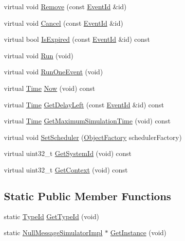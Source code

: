 \begin{DoxyCompactItemize}
\item 
virtual void \hyperlink{classns3_1_1NullMessageSimulatorImpl_a1b051000ba1d74a9cd78a609822465b0}{Remove} (const \hyperlink{classns3_1_1EventId}{Event\+Id} \&id)
\item 
virtual void \hyperlink{classns3_1_1NullMessageSimulatorImpl_acfa9062b608a3b3ddcf03cec0d63897a}{Cancel} (const \hyperlink{classns3_1_1EventId}{Event\+Id} \&id)
\item 
virtual bool \hyperlink{classns3_1_1NullMessageSimulatorImpl_ae7d4cb0311ded5e063a9cdc06b6449d6}{Is\+Expired} (const \hyperlink{classns3_1_1EventId}{Event\+Id} \&id) const 
\item 
virtual void \hyperlink{classns3_1_1NullMessageSimulatorImpl_ab6919d906d7706a688b4452127860b77}{Run} (void)
\item 
virtual void \hyperlink{classns3_1_1NullMessageSimulatorImpl_a58772e74e6e1b546a843d7a62b708069}{Run\+One\+Event} (void)
\item 
virtual \hyperlink{classns3_1_1Time}{Time} \hyperlink{classns3_1_1NullMessageSimulatorImpl_a1ac2550da600b606b266a2f955c6facc}{Now} (void) const 
\item 
virtual \hyperlink{classns3_1_1Time}{Time} \hyperlink{classns3_1_1NullMessageSimulatorImpl_accbe8af5982c79c7849ea3914f0f4438}{Get\+Delay\+Left} (const \hyperlink{classns3_1_1EventId}{Event\+Id} \&id) const 
\item 
virtual \hyperlink{classns3_1_1Time}{Time} \hyperlink{classns3_1_1NullMessageSimulatorImpl_a1a5ea06acb8924c8890b7fc1ed3d4004}{Get\+Maximum\+Simulation\+Time} (void) const 
\item 
virtual void \hyperlink{classns3_1_1NullMessageSimulatorImpl_a41a3b29c50b30e5a368824aa74819398}{Set\+Scheduler} (\hyperlink{classns3_1_1ObjectFactory}{Object\+Factory} scheduler\+Factory)
\item 
virtual uint32\+\_\+t \hyperlink{classns3_1_1NullMessageSimulatorImpl_a41e0e790329b78ceb5ff03fe43de2b3e}{Get\+System\+Id} (void) const 
\item 
virtual uint32\+\_\+t \hyperlink{classns3_1_1NullMessageSimulatorImpl_abeb0b7b36321fbf48ed467d0404234b7}{Get\+Context} (void) const 
\end{DoxyCompactItemize}
\subsection*{Static Public Member Functions}
\begin{DoxyCompactItemize}
\item 
static \hyperlink{classns3_1_1TypeId}{Type\+Id} \hyperlink{classns3_1_1NullMessageSimulatorImpl_ada952d69268b2ae1e8496e17d6505550}{Get\+Type\+Id} (void)
\item 
static \hyperlink{classns3_1_1NullMessageSimulatorImpl}{Null\+Message\+Simulator\+Impl} $\ast$ \hyperlink{classns3_1_1NullMessageSimulatorImpl_ab5e219b843d754b0e812181af6115a53}{Get\+Instance} (void)
\end{DoxyCompactItemize}
